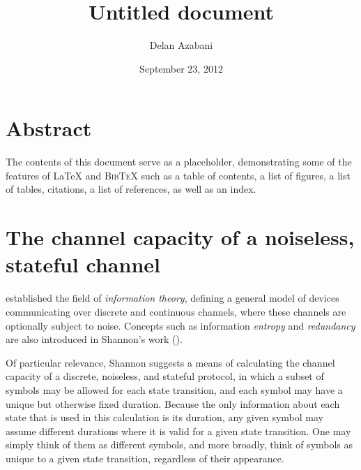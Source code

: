 \documentclass[a4paper,titlepage,12pt]{article}
\title{Untitled document}
\date{September 23, 2012}
\author{Delan Azabani}
\begin{document}
\maketitle
{}

\vspace*{0.2\vsize}
\hspace{0.1\hsize}
\begin{minipage}{0.8\hsize}

\section*{Abstract}

The contents of this document serve as a placeholder, demonstrating some of
the features of {\LaTeX} and \textsc{Bib\TeX} such as a table of contents, a
list of figures, a list of tables, citations, a list of references, as well as
an index.

\end{minipage}

\newpage
\tableofcontents
\newpage
\renewcommand{\listfigurename}{List of figures}
\listoffigures
\newpage
\renewcommand{\listtablename}{List of tables}
\listoftables
\newpage
{}

\section{The channel capacity of a noiseless, stateful channel}

\textcite{Shannon1948} established the field of \emph{information
theory}, defining a general model of devices
communicating over discrete and continuous channels, where these channels are
optionally subject to noise. Concepts such as information \emph{entropy}
 and \emph{redundancy} are also introduced in
Shannon's work (\cite{Shannon1948}).

Of particular relevance, Shannon suggests a means of calculating the channel
capacity of a discrete, noiseless, and stateful protocol, in which a subset of
symbols may be allowed for each state transition, and each symbol may have a
unique but otherwise fixed duration. Because the only information about each
state that is used in this calculation is its duration, any given symbol may
assume different durations where it is valid for a given state transition.
One may simply think of them as different symbols, and more broadly, think of
symbols as unique to a given state transition, regardless of their appearance.
\end{document}
